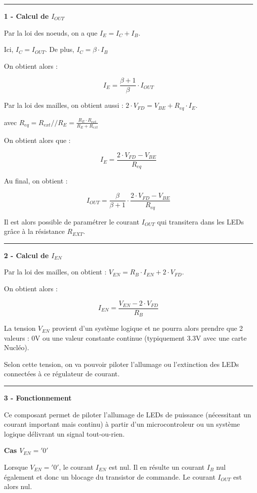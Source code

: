 \documentclass[a4paper,french]{paper}
\begin{document}
\rule{\linewidth}{.5pt}

\textbf{1 - Calcul de $I_{OUT}$}

Par la loi des noeuds, on a que $I_{E} = I_{C} + I_{B}$.

Ici, $I_{C} = I_{OUT}$. De plus, $I_{C} = \beta \cdot I_{B}$

On obtient alors :

$$\boxed{I_{E} =  \frac{\beta + 1}{\beta} \cdot I_{OUT}}$$

\medskip

Par la loi des mailles, on obtient aussi : $2 \cdot V_{FD} = V_{BE} + R_{eq} \cdot I_E$.

avec $R_{eq} = R_{ext} // R_E = \frac{R_E \cdot R_{ext}}{R_E + R_{ext}}$

On obtient alors que :

$$\boxed{I_{E} =  \frac{2 \cdot V_{FD} - V_{BE}}{R_{eq}}}$$

\medskip

Au final, on obtient : 

$$\boxed{I_{OUT} = \frac{\beta}{\beta + 1} \cdot \frac{2 \cdot V_{FD} - V_{BE}}{R_{eq}}}$$

Il est alors possible de paramétrer le courant $I_{OUT}$ qui transitera dans les LEDs grâce à la résistance $R_{EXT}$.


\rule{\linewidth}{.5pt}

\textbf{2 - Calcul de $I_{EN}$}

Par la loi des mailles, on obtient : $V_{EN} = R_B \cdot I_{EN} + 2 \cdot V_{FD}$.

On obtient alors : 

$$\boxed{I_{EN} = \frac{V_{EN} - 2 \cdot V_{FD}}{R_B}}$$

La tension $V_{EN}$ provient d'un système logique et ne pourra alors prendre que 2 valeurs : 0V ou une valeur constante continue (typiquement 3.3V avec une carte Nucléo).

Selon cette tension, on va pouvoir piloter l'allumage ou l'extinction des LEDs connectées à ce régulateur de courant.

\rule{\linewidth}{.5pt}

\textbf{3 - Fonctionnement}

Ce composant permet de piloter l'allumage de LEDs de puissance (nécessitant un courant important mais continu) à partir d'un microcontroleur ou un système logique délivrant un signal tout-ou-rien.

\textbf{Cas $V_{EN} = '0'$}

Lorsque $V_{EN} = '0'$, le courant $I_{EN}$ est nul. Il en résulte un courant $I_B$ nul également et donc un blocage du transistor de commande. Le courant $I_{OUT}$ est alors nul.
\end{document}
